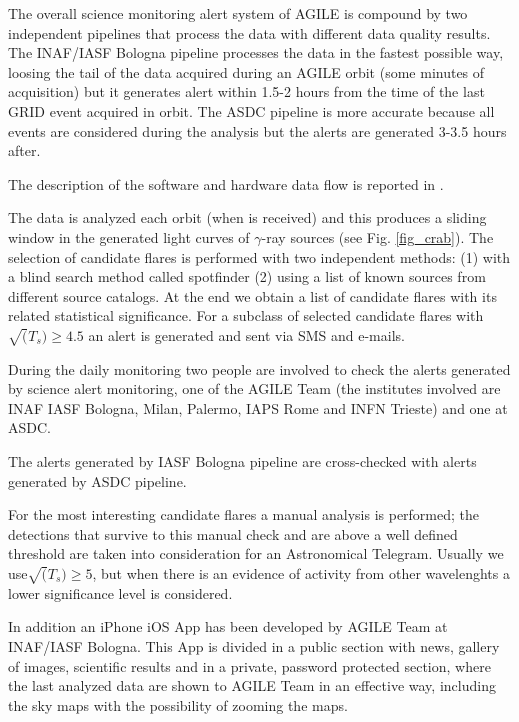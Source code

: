     The overall science monitoring alert system of AGILE is compound
      by two independent pipelines that process the data with different
      data quality results. The INAF/IASF Bologna pipeline processes the
      data in the fastest possible way, loosing the tail of the data
      acquired during an AGILE orbit (some minutes of acquisition) but
      it generates alert within 1.5-2 hours from the time of the last
      GRID event acquired in orbit. The ASDC pipeline is more accurate
      because all events are considered during the analysis but the
      alerts are generated 3-3.5 hours after.
      
      The description of the software and hardware data flow is reported in \citep{2009ASPC..411..362B}.
      
      The data is analyzed each orbit (when is received) and this
      produces a sliding window in the generated light curves of $\gamma$-ray
      sources (see Fig. \ref{fig_crab}). The selection of candidate flares is performed with two independent
      methods:
      (1) with a blind search method called spotfinder
      (2) using a list of known sources from different source
          catalogs.
At the end we obtain a list of candidate flares with its related
      statistical significance.
    For a subclass of selected candidate flares with $\sqrt(T_s) \ge 4.5$ an
      alert is generated and sent via SMS and e-mails.



During the daily monitoring two people are involved to check the
      alerts generated by science alert monitoring, one of the AGILE Team (the institutes
      involved are INAF IASF Bologna, Milan, Palermo, IAPS Rome and
      INFN Trieste) and one at ASDC.
     
     The alerts generated by IASF Bologna pipeline are cross-checked
      with alerts generated by ASDC pipeline. 
      
       For the most interesting candidate flares a manual analysis is performed; the detections that survive to this manual check and are
          above a well defined threshold are taken into consideration
          for an Astronomical Telegram. Usually we use$\sqrt(T_s) \ge 5$,
          but when there is an evidence of activity from other
          wavelenghts a lower significance level is considered. 

In addition an iPhone iOS App has been developed by AGILE Team at INAF/IASF Bologna. This App is divided
      in a public section with news, gallery of images, scientific
      results and in a private, password protected section, where the
      last analyzed data are shown to AGILE Team in an effective way,
      including the sky maps with the possibility of zooming the maps.
      
